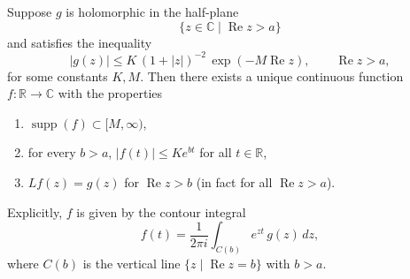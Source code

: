 Suppose $g$ is holomorphic in the half-plane
$$\{z \in \mathbb{C} \mid \operatorname{Re} z > a\}$$
and satisfies the inequality
$$|g(z)| \leq K \, (1 + |z|)^{-2} \, \exp(-M \operatorname{Re} z), \qquad \operatorname{Re} z > a,$$
for some constants $K, M$. Then there exists a unique continuous function $f \colon \mathbb{R} \to \mathbb{C}$ with the properties
\begin{enumerate}
\item $\operatorname{supp}(f) \subset [M, \infty)$,
\item for every $b > a$, $|f(t)| \leq K e^{bt}$ for all $t \in \mathbb{R}$,
\item $Lf(z) = g(z)$ for $\operatorname{Re} z > b$ (in fact for all $\operatorname{Re} z > a$).
\end{enumerate}
Explicitly, $f$ is given by the contour integral
$$f(t) = \frac{1}{2\pi i} \int_{C(b)} e^{zt} \, g(z) \, dz,$$
where $C(b)$ is the vertical line $\{z \mid \operatorname{Re} z = b\}$ with $b > a$.
